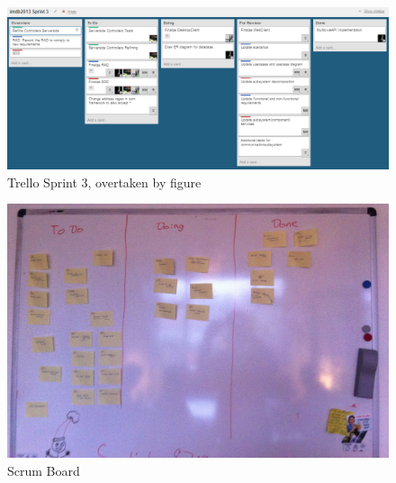 \begin{figure}[h]
\begin{center}
\includegraphics[scale=0.5]{img/SCRUM/trelloSprint3.png}
\caption{Trello Sprint 3, overtaken by figure}
\label{fig:Trello Sprint 3}
\end{center}
\end{figure}   

\begin{figure}[h]
\begin{center}
\includegraphics[scale=0.15]{img/SCRUM/scrumBoard1.jpg}
\caption{Scrum Board}
\label{fig:Scrum Board1}
\end{center}
\end{figure} 

       
